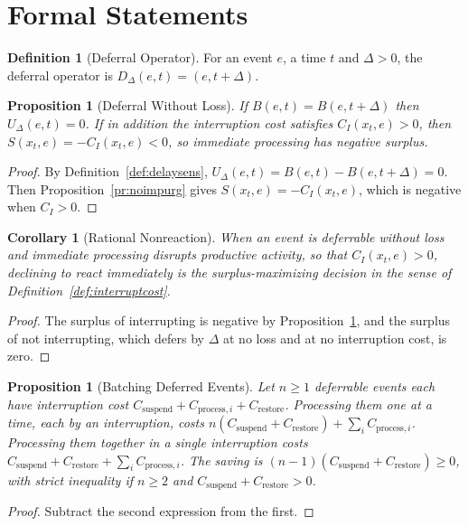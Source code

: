 \documentclass[11pt,letterpaper]{report}
\theoremstyle{plain}
\newtheorem{proposition}[theorem]{Proposition}
\newtheorem{corollary}[theorem]{Corollary}
\theoremstyle{definition}
\newtheorem{definition}[theorem]{Definition}
\theoremstyle{remark}
\begin{document}
\section{Formal Statements}

\begin{definition}[Deferral Operator]\label{def:deferral}
For an event $e$, a time $t$ and $\Delta>0$, the deferral operator is $D_\Delta(e,t)=(e,t+\Delta)$.
\end{definition}

\begin{proposition}[Deferral Without Loss]\label{pr:deferral}
If $B(e,t)=B(e,t+\Delta)$ then $U_\Delta(e,t)=0$. If in addition the interruption cost satisfies $C_I(x_t,e)>0$, then $S(x_t,e)=-C_I(x_t,e)<0$, so immediate processing has negative surplus.
\end{proposition}
\begin{proof}
By Definition~\ref{def:delaysens}, $U_\Delta(e,t)=B(e,t)-B(e,t+\Delta)=0$. Then Proposition~\ref{pr:noimpurg} gives $S(x_t,e)=-C_I(x_t,e)$, which is negative when $C_I>0$.
\end{proof}

\begin{corollary}[Rational Nonreaction]\label{co:nonreaction}
When an event is deferrable without loss and immediate processing disrupts productive activity, so that $C_I(x_t,e)>0$, declining to react immediately is the surplus-maximizing decision in the sense of Definition~\ref{def:interruptcost}.
\end{corollary}
\begin{proof}
The surplus of interrupting is negative by Proposition~\ref{pr:deferral}, and the surplus of not interrupting, which defers by $\Delta$ at no loss and at no interruption cost, is zero.
\end{proof}

\begin{proposition}[Batching Deferred Events]\label{pr:batching}
Let $n\ge1$ deferrable events each have interruption cost $C_{\mathrm{suspend}}+C_{\mathrm{process},i}+C_{\mathrm{restore}}$. Processing them one at a time, each by an interruption, costs $n(C_{\mathrm{suspend}}+C_{\mathrm{restore}})+\sum_iC_{\mathrm{process},i}$. Processing them together in a single interruption costs $C_{\mathrm{suspend}}+C_{\mathrm{restore}}+\sum_iC_{\mathrm{process},i}$. The saving is $(n-1)(C_{\mathrm{suspend}}+C_{\mathrm{restore}})\ge0$, with strict inequality if $n\ge2$ and $C_{\mathrm{suspend}}+C_{\mathrm{restore}}>0$.
\end{proposition}
\begin{proof}
Subtract the second expression from the first.
\end{proof}
\end{document}
